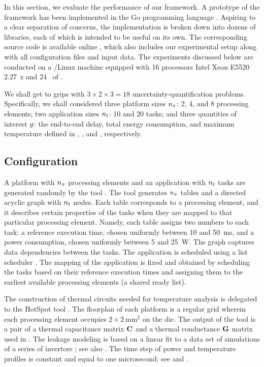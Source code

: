 In this section, we evaluate the performance of our framework. A prototype of
the framework has been implemented in the Go programming language \cite{go}.
Aspiring to a clear separation of concerns, the implementation is broken down
into dozens of libraries, each of which is intended to be useful on its own. The
corresponding source code is available online \cite{sources}, which also
includes our experimental setup along with all configuration files and input
data. The experiments discussed below are conducted on a /Linux machine
equipped with 16 processors Intel Xeon E5520 2.27~z and 24~ of
.

We shall get to grips with $3 \times 2 \times 3 = 18$ uncertainty-quantification
problems. Specifically, we shall considered three platform sizes ${n_\pi}$: 2, 4,
and 8 processing elements; two application sizes ${n_t}$: 10 and 20 tasks; and
three quantities of interest $g$: the end-to-end delay, total energy
consumption, and maximum temperature defined in ,
, and , respectively.

\subsection{Configuration} 

A platform with ${n_\pi}$ processing elements and an application with ${n_t}$ tasks
are generated randomly by the  tool \cite{dick1998}. The tool generates
${n_\pi}$ tables and a directed acyclic graph with ${n_t}$ nodes. Each table
corresponds to a processing element, and it describes certain properties of the
tasks when they are mapped to that particular processing element. Namely, each
table assigns two numbers to each task: a reference execution time, chosen
uniformly between 10 and 50~ms, and a power consumption, chosen uniformly
between 5 and 25~W. The graph captures data dependencies between the tasks. The
application is scheduled using a list scheduler \cite{adam1974}. The mapping of
the application is fixed and obtained by scheduling the tasks based on their
reference execution times and assigning them to the earliest available
processing elements (a shared ready list).

The construction of thermal  circuits needed for temperature analysis is
delegated to the HotSpot tool \cite{skadron2004}. The floorplan of each platform
is a regular grid wherein each processing element occupies $2 \times
2~\text{mm}^2$ on the die. The output of the tool is a pair of a thermal
capacitance matrix $\mathbf{C}$ and a thermal conductance $\mathbf{G}$ matrix used in
. The leakage modeling is based on a linear fit to a data
set of  simulations of a series of  invertors
\cite{ukhov2012, liu2007}; see also \cite{ukhov2014}. The time step of power and
temperature profiles is constant and equal to one microsecond; see 
and .

